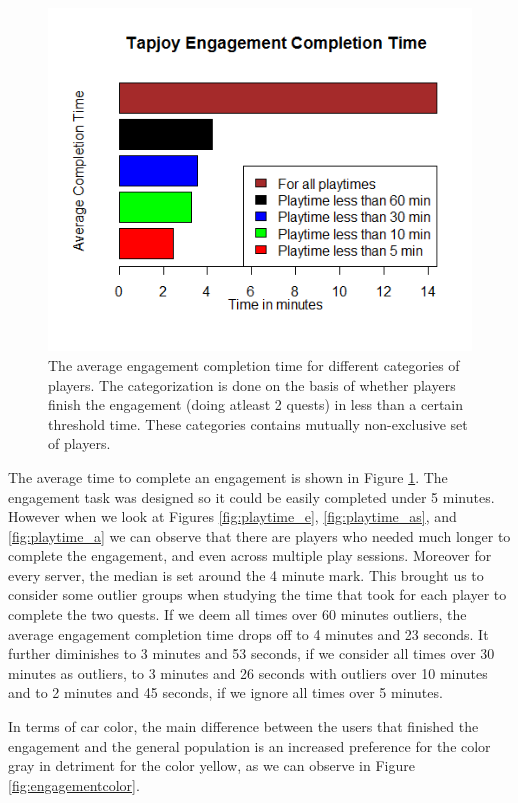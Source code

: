 \documentclass[preprint,authoryear,12pt]{elsarticle}
\begin{document}
\begin{figure}[htb]
	\begin{center}
		\includegraphics[width=.6\linewidth]{ijhcs14-img/time}
		\caption{ The average engagement completion time for different categories of players. The categorization is done on the basis of whether players finish the engagement (doing atleast 2 quests) in less than a certain threshold time. These categories contains mutually non-exclusive set of players.\label{fig:time}}
	\end{center}
\end{figure}


The average time to complete an engagement is shown in Figure \ref{fig:time}. The engagement task was designed so it could be easily completed under 5 minutes.
However when we look at Figures \ref{fig:playtime_e}, \ref{fig:playtime_as}, and \ref{fig:playtime_a} we can observe that there are players who needed much longer to complete the engagement, and even across multiple play sessions. Moreover for every server, the median is set around the 4 minute mark. This brought us to consider some outlier groups when studying the time that took for each player to complete the two quests.
If we deem all times over 60 minutes outliers, the average engagement completion time drops off to 4 minutes and 23 seconds. It further diminishes to 3 minutes and 53 seconds, if we consider all times over 30 minutes as outliers, to 3 minutes and 26 seconds with outliers over 10 minutes and to 2 minutes and 45 seconds, if we ignore all times over 5 minutes.

In terms of car color, the main difference between the users that finished the engagement and the general population is an increased preference for the color gray in detriment for the color yellow, as we can observe in Figure \ref{fig:engagementcolor}.
\end{document}

